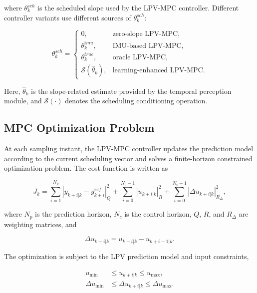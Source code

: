 \documentclass{ieeeaccess}
\begin{document}
where $\theta^{sch}_k$ is the scheduled slope used by the LPV-MPC controller. Different controller variants use different sources of $\theta^{sch}_k$:

\begin{equation}
\theta^{sch}_k =
\begin{cases}
0, & \text{zero-slope LPV-MPC},\\
\theta^{imu}_k, & \text{IMU-based LPV-MPC},\\
\theta^{true}_k, & \text{oracle LPV-MPC},\\
\mathcal{S}(\hat{\theta}_k), & \text{learning-enhanced LPV-MPC}.
\end{cases}
\label{eq:theta_sources}
\end{equation}

Here, $\hat{\theta}_k$ is the slope-related estimate provided by the temporal perception module, and $\mathcal{S}(\cdot)$ denotes the scheduling conditioning operation.



\subsection{MPC Optimization Problem}



At each sampling instant, the LPV-MPC controller updates the prediction model according to the current scheduling vector and solves a finite-horizon constrained optimization problem. The cost function is written as

\begin{equation}
J_k =
\sum_{i=1}^{N_p}
\left|y_{k+i|k}-y^{ref}_{k+i}\right|_{Q}^{2}
+
\sum_{i=0}^{N_c-1}
\left|u_{k+i|k}\right|_{R}^{2}
+
\sum_{i=0}^{N_c-1}
\left|\Delta u_{k+i|k}\right|_{R_{\Delta}}^{2},
\label{eq:mpc_cost}
\end{equation}

where $N_p$ is the prediction horizon, $N_c$ is the control horizon, $Q$, $R$, and $R_{\Delta}$ are weighting matrices, and

\begin{equation}
\Delta u_{k+i|k}=u_{k+i|k}-u_{k+i-1|k}.
\label{eq:delta_u}
\end{equation}



The optimization is subject to the LPV prediction model and input constraints,

\begin{align}
u_{\min} &\leq u_{k+i|k} \leq u_{\max}, \label{eq:input_constraint}\\
\Delta u_{\min} &\leq \Delta u_{k+i|k} \leq \Delta u_{\max}.
\label{eq:input_rate_constraint}
\end{align}
\end{document}

